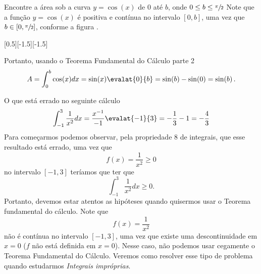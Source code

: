 \begin{example}
  Encontre a área sob a curva $y=\cos(x) $ de $0$ até $b$, onde
  \(0 \leq b \leq \sfrac{\pi}{2}\)
  \solution
  Note que a função $y=\cos(x)$ é positiva e contínua no intervalo $[0, b]$,
  uma vez que \(b \in \left[0, \sfrac{\pi}{2}\right]\), conforme a figura .

  [0.5][-1.5][-1.5]

  Portanto, usando o Teorema Fundamental do Cálculo parte 2
  \[
    A
    = \int_0^b \cos(x) dx
    = \sin(x) \evalat{0}{b}
    = \sin(b) - \sin(0)
    = \sin(b) \,.
  \]
\end{example}

\begin{example}
  O que está errado no seguinte cálculo
  \[
    \int_{-1}^3 \frac{1}{x^2} dx
    = \frac{x^{-1}}{-1} \evalat{-1}{3}
    = - \frac{1}{3} - 1
    = - \frac{4}{3}
  \]
  \solution
  Para começarmos podemos observar, pela propriedade 8 de integrais, que esse
  resultado está errado, uma vez que
  \[
    f(x) = \frac{1}{x^2} \geq 0
  \]
  no intervalo
  $[-1, 3]$ teríamos que ter que
  \[
    \int_{-1}^3 \frac{1}{x^2} dx \geq 0.
  \]
  Portanto, devemos estar atentos as hipóteses quando quisermos usar o Teorema
  fundamental do cálculo. Note que
  \[
    f(x)=\frac{1}{x^2}
  \]
  não é contínua no intervalo $[-1, 3]$, uma vez que existe uma descontinuidade
  em $x=0$ ($f$ não está definida em $x=0$).
  Nesse caso, não podemos usar cegamente o Teorema
  Fundamental do Cálculo. Veremos como resolver esse tipo de problema quando
  estudarmos \emph{Integrais impróprias}.
\end{example}

